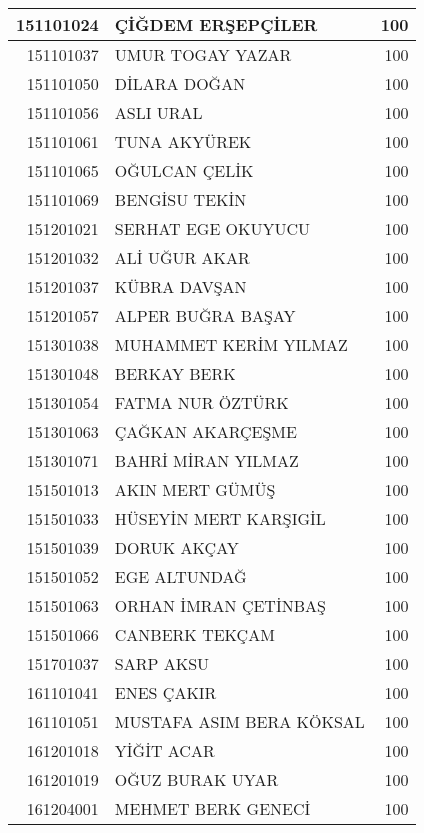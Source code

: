 \documentclass[12pt]{article}
\begin{document}
\begin{longtable}{||r||l||r||}
    \midrule
    151101024 & ÇİĞDEM ERŞEPÇİLER & 100 \\
    \midrule
    151101037 & UMUR TOGAY YAZAR & 100 \\
    \midrule
    151101050 & DİLARA DOĞAN & 100 \\
    \midrule
    151101056 & ASLI URAL & 100 \\
    \midrule
    151101061 & TUNA AKYÜREK & 100 \\
    \midrule
    151101065 & OĞULCAN ÇELİK & 100 \\
    \midrule
    151101069 & BENGİSU TEKİN & 100 \\
    \midrule
    151201021 & SERHAT EGE OKUYUCU & 100 \\
    \midrule
    151201032 & ALİ UĞUR AKAR & 100 \\
    \midrule
    151201037 & KÜBRA DAVŞAN & 100 \\
    \midrule
    151201057 & ALPER BUĞRA BAŞAY & 100 \\
    \midrule
    151301038 & MUHAMMET KERİM YILMAZ & 100 \\
    \midrule
    151301048 & BERKAY BERK & 100 \\
    \midrule
    151301054 & FATMA NUR ÖZTÜRK & 100 \\
    \midrule
    151301063 & ÇAĞKAN AKARÇEŞME & 100 \\
    \midrule
    151301071 & BAHRİ MİRAN YILMAZ & 100 \\
    \midrule
    151501013 & AKIN MERT GÜMÜŞ & 100 \\
    \midrule
    151501033 & HÜSEYİN MERT KARŞIGİL & 100 \\
    \midrule
    151501039 & DORUK AKÇAY & 100 \\
    \midrule
    151501052 & EGE ALTUNDAĞ & 100 \\
    \midrule
    151501063 & ORHAN İMRAN ÇETİNBAŞ & 100 \\
    \midrule
    151501066 & CANBERK TEKÇAM & 100 \\
    \midrule
    151701037 & SARP AKSU & 100 \\
    \midrule
    161101041 & ENES ÇAKIR & 100 \\
    \midrule
    161101051 & MUSTAFA ASIM BERA KÖKSAL & 100 \\
    \midrule
    161201018 & YİĞİT ACAR & 100 \\
    \midrule
    161201019 & OĞUZ BURAK UYAR & 100 \\
    \midrule
    161204001 & MEHMET BERK GENECİ & 100 \\

\end{longtable}
\end{document}
